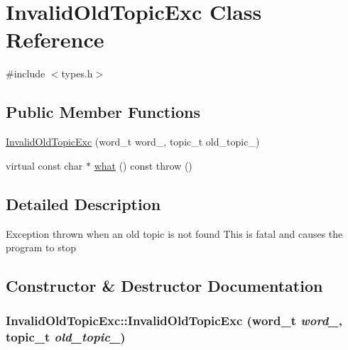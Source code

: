 \hypertarget{class_invalid_old_topic_exc}{
\section{InvalidOldTopicExc Class Reference}
\label{class_invalid_old_topic_exc}
}


{\ttfamily \#include $<$types.h$>$}

\subsection*{Public Member Functions}
\begin{DoxyCompactItemize}
\item 
\hyperlink{class_invalid_old_topic_exc_a2ed61dc0c0cc90fdd72d44988496af0f}{InvalidOldTopicExc} (word\_\-t word\_\-, topic\_\-t old\_\-topic\_\-)
\item 
virtual const char $\ast$ \hyperlink{class_invalid_old_topic_exc_a5a01f4d3e6e8deb0076d6c116f0bec24}{what} () const   throw ()
\end{DoxyCompactItemize}


\subsection{Detailed Description}
Exception thrown when an old topic is not found This is fatal and causes the program to stop 

\subsection{Constructor \& Destructor Documentation}
\hypertarget{class_invalid_old_topic_exc_a2ed61dc0c0cc90fdd72d44988496af0f}{
\subsubsection[{InvalidOldTopicExc}]{\setlength{\rightskip}{0pt plus 5cm}InvalidOldTopicExc::InvalidOldTopicExc (word\_\-t {\em word\_\-}, \/  topic\_\-t {\em old\_\-topic\_\-})}}
\label{class_invalid_old_topic_exc_a2ed61dc0c0cc90fdd72d44988496af0f}


